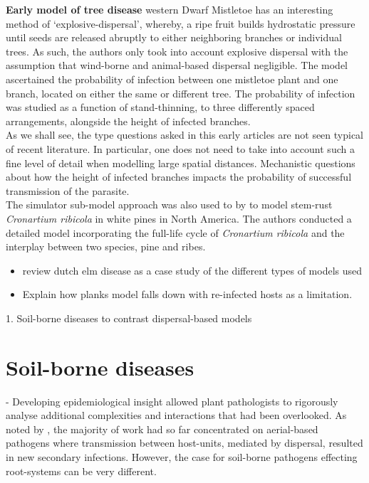     \textbf{Early model of tree disease} western Dwarf Mistletoe has an interesting method of `explosive-dispersal', whereby, a ripe fruit builds hydrostatic pressure until seeds are released abruptly to either neighboring branches or individual trees. As such, the authors only took into account explosive dispersal with the assumption that wind-borne and animal-based dispersal negligible. The model ascertained the probability of infection between one mistletoe plant and one branch, located on either the same or different tree. The probability of infection was studied as a function of stand-thinning, to three differently spaced arrangements, alongside the height of infected branches.\\
     
     As we shall see, the type questions asked in this early articles are not seen typical of recent literature. In particular, one does not need to take into account such a fine level of detail when modelling large spatial distances. Mechanistic questions about how the height of infected branches impacts the probability of successful transmission of the parasite.\\
     
     The simulator sub-model approach was also used to by \cite{mcdonald1981computer} to model stem-rust \textit{Cronartium ribicola} in white pines in North America. The authors conducted a detailed model incorporating the full-life cycle of \textit{Cronartium ribicola} and the interplay between two species, pine and ribes.\\
     
    \begin{itemize}
        \item  review dutch elm disease as a case study of the different types of models used \cite{doi:10.1098/rstb.1996.0059}
        \item Explain how planks model falls down with re-infected hosts as a limitation.
    \end{itemize}



1. Soil-borne diseases to contrast dispersal-based models
    \section{Soil-borne diseases}
    
    - Developing epidemiological insight allowed plant pathologists to rigorously analyse additional complexities and interactions that had been overlooked. As noted by \cite{doi:10.1146/annurev.py.21.090183.000401}, the majority of work had so far concentrated on aerial-based pathogens where transmission between host-units, mediated by dispersal, resulted in new secondary infections. However, the case for soil-borne pathogens effecting root-systems can be very different. 
    

